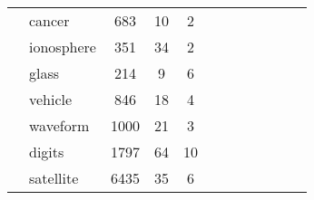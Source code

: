 \begin{tabular}{l l C{0.6\tblw} C{0.6\tblw} C{0.6\tblw} C{0.6\tblw} C{0.6\tblw}  C{0.6\tblw}  C{0.6\tblw} C{0.6\tblw}  C{0.6\tblw}  C{0.6\tblw}}
& \sc cancer & 683 & 10 & 2 &  &  &  &  \\
& \sc ionosphere & 351 & 34 & 2 &  &  &  &  \\
& \sc glass & 214 & 9 & 6 &  &  &  &  \\
& \sc vehicle & 846 & 18 & 4 &  &  &  &  \\
& \sc waveform & 1000 & 21 & 3 &  &  &  &  \\
& \sc digits & 1797 & 64 & 10 &  &  &  &  \\
& \sc satellite & 6435 & 35 & 6 &  &  &  &  \\
\midrule
\bottomrule
\end{tabular}
